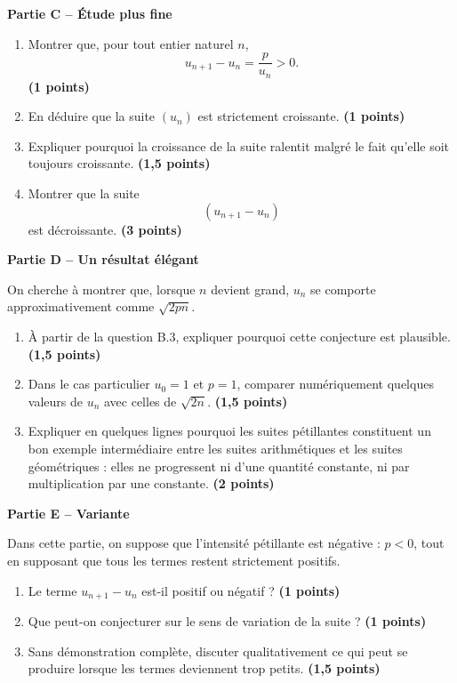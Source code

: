 \documentclass[11pt,a4paper]{article}
\newcommand{\bareme}[1]{\hfill{\color{blue!70!black}\textbf{(#1 points)}}}
\begin{document}
\medskip

\textbf{Partie C -- Étude plus fine}

\begin{enumerate}[label=\textbf{C.\arabic*.}, leftmargin=0.9cm]
    \item Montrer que, pour tout entier naturel $n$,
    \[
    u_{n+1}-u_n=\frac{p}{u_n}>0.
    \]
    \bareme{1}
    \item En déduire que la suite $(u_n)$ est strictement croissante. \bareme{1}
    \item Expliquer pourquoi la croissance de la suite ralentit malgré le fait qu’elle soit toujours croissante. \bareme{1,5}
    \item Montrer que la suite
    \[
    \left(u_{n+1}-u_n\right)
    \]
    est décroissante. \bareme{3}
\end{enumerate}

\medskip

\textbf{Partie D -- Un résultat élégant}

On cherche à montrer que, lorsque $n$ devient grand, $u_n$ se comporte approximativement comme $\sqrt{2pn}$.

\begin{enumerate}[label=\textbf{D.\arabic*.}, leftmargin=0.9cm]
    \item À partir de la question B.3, expliquer pourquoi cette conjecture est plausible. \bareme{1,5}
    \item Dans le cas particulier $u_0=1$ et $p=1$, comparer numériquement quelques valeurs de $u_n$ avec celles de $\sqrt{2n}$. \bareme{1,5}
    \item Expliquer en quelques lignes pourquoi les suites pétillantes constituent un bon exemple intermédiaire entre les suites arithmétiques et les suites géométriques : elles ne progressent ni d’une quantité constante, ni par multiplication par une constante. \bareme{2}
\end{enumerate}

\medskip

\textbf{Partie E -- Variante}

Dans cette partie, on suppose que l’intensité pétillante est négative : $p<0$, tout en supposant que tous les termes restent strictement positifs.

\begin{enumerate}[label=\textbf{E.\arabic*.}, leftmargin=0.9cm]
    \item Le terme $u_{n+1}-u_n$ est-il positif ou négatif ? \bareme{1}
    \item Que peut-on conjecturer sur le sens de variation de la suite ? \bareme{1}
    \item Sans démonstration complète, discuter qualitativement ce qui peut se produire lorsque les termes deviennent trop petits. \bareme{1,5}
\end{enumerate}
\end{document}
